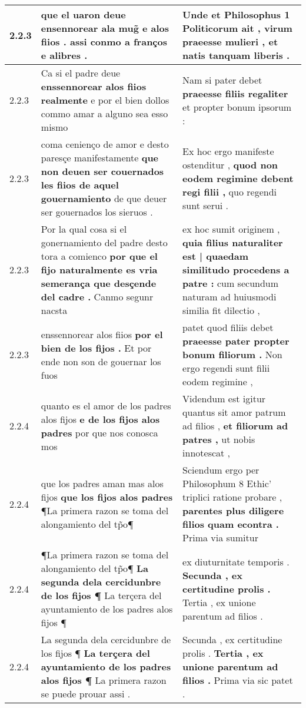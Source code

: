 \begin{tabular}{|p{1cm}|p{6.5cm}|p{6.5cm}|}
2.2.3 & que el uaron deue \textbf{ ensennorear ala mug̃ e alos fiios . } assi conmo a franços e alibres . & Unde et Philosophus 1 Politicorum ait , \textbf{ virum praeesse mulieri , } et natis tanquam liberis . \\\hline
2.2.3 & Ca si el padre deue \textbf{ enssennorear alos fiios realmente } e por el bien dollos commo amar a alguno sea esso mismo & Nam si pater debet \textbf{ praeesse filiis regaliter } et propter bonum ipsorum : \\\hline
2.2.3 & coma cenienço de amor e desto paresçe manifestamente \textbf{ que non deuen ser couernados les fiios de aquel gouernamiento } de que deuer ser gouernados los sieruos . & Ex hoc ergo manifeste ostenditur , \textbf{ quod non eodem regimine debent regi filii , } quo regendi sunt serui . \\\hline
2.2.3 & Por la qual cosa si el gonernamiento del padre desto tora a comienco \textbf{ por que el fijo naturalmente es vria semerança que desçende del cadre . } Canmo segunr nacsta & ex hoc sumit originem , \textbf{ quia filius naturaliter est | quaedam similitudo procedens a patre : } cum secundum naturam ad huiusmodi similia fit dilectio , \\\hline
2.2.3 & enssennorear alos fiios \textbf{ por el bien de los fijos . } Et por ende non son de gouernar los fuos & patet quod filiis debet \textbf{ praeesse pater propter bonum filiorum . } Non ergo regendi sunt filii eodem regimine , \\\hline
2.2.4 & quanto es el amor de los padres alos fijos \textbf{ e de los fijos alos padres } por que nos conosca mos & Videndum est igitur quantus sit amor patrum ad filios , \textbf{ et filiorum ad patres , } ut nobis innotescat , \\\hline
2.2.4 & que los padres aman mas alos fijos \textbf{ que los fijos alos padres } ¶La primera razon se toma del alongamiento del tp̃o¶ & Sciendum ergo per Philosophum 8 Ethic’ triplici ratione probare , \textbf{ parentes plus diligere filios quam econtra . } Prima via sumitur \\\hline
2.2.4 & ¶La primera razon se toma del alongamiento del tp̃o¶ \textbf{ La segunda dela cercidunbre de los fijos ¶ } La terçera del ayuntamiento de los padres alos fijos ¶ & ex diuturnitate temporis . \textbf{ Secunda , ex certitudine prolis . } Tertia , ex unione parentum ad filios . \\\hline
2.2.4 & La segunda dela cercidunbre de los fijos ¶ \textbf{ La terçera del ayuntamiento de los padres alos fijos ¶ } La primera razon se puede prouar assi . & Secunda , ex certitudine prolis . \textbf{ Tertia , ex unione parentum ad filios . } Prima via sic patet . \\\hline

\end{tabular}
